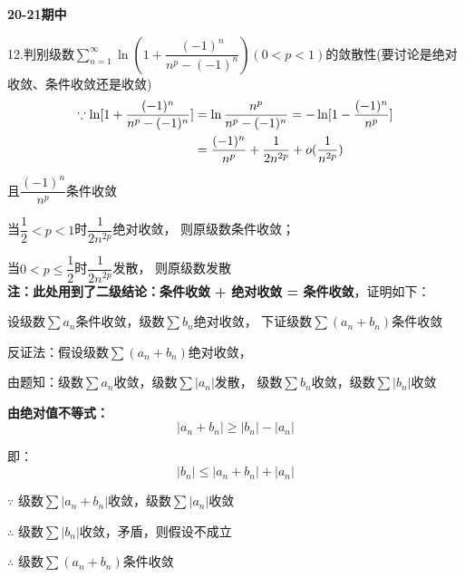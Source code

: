 \begin{center}
    \textbf{\large{20-21期中}}
\end{center}


12.判别级数$\sum\limits _{n=1}^\infty 
\ln (1+\dfrac{(-1)^n}{n^p-(-1)^n})(0<p<1)$的敛散性(要讨论是绝对收敛、条件收敛还是收敛)
\begin{align}
    \because \ln [1+\dfrac{(-1)^n}{n^p-(-1)^n}] &= 
    \ln \dfrac{n^p}{n^p-(-1)^n} 
    = -\ln [1-\dfrac{(-1)^n}{n^p}] \notag
    \\ &= \dfrac{(-1)^n}{n^p} + \dfrac{1}{2n^{2p}}+o(\dfrac{1}{n^{2p}}) \notag
\end{align}

且$\dfrac{(-1)^n}{n^p}$条件收敛


当$\dfrac{1}{2}<p<1$时$\dfrac{1}{2n^{2p}}$绝对收敛，
则原级数条件收敛；


当$0<p\leq \dfrac{1}{2}$时$\dfrac{1}{2n^{2p}}$发散，
则原级数发散
~\\

\textbf{注：此处用到了二级结论：条件收敛 + 绝对收敛 = 条件收敛}，证明如下：


设级数$\sum a_n$条件收敛，级数$\sum b_n$绝对收敛，
下证级数$\sum (a_n+b_n)$条件收敛


反证法：假设级数$\sum (a_n+b_n)$绝对收敛，


由题知：级数$\sum a_n$收敛，级数$\sum \left \vert a_n \right \vert $发散，
级数$\sum b_n$收敛，级数$\sum \left \vert b_n \right \vert$收敛


\textbf{由绝对值不等式：}
$$\left \vert a_n+b_n \right \vert \geq |b_n|-|a_n|$$


即：
$$|b_n| \leq |a_n+b_n| + |a_n|$$


$\because$ 级数$\sum |a_n+b_n|$收敛，级数$\sum |a_n|$收敛

$\therefore$ 级数$\sum |b_n|$收敛，矛盾，则假设不成立

$\therefore$ 级数$\sum (a_n+b_n)$条件收敛